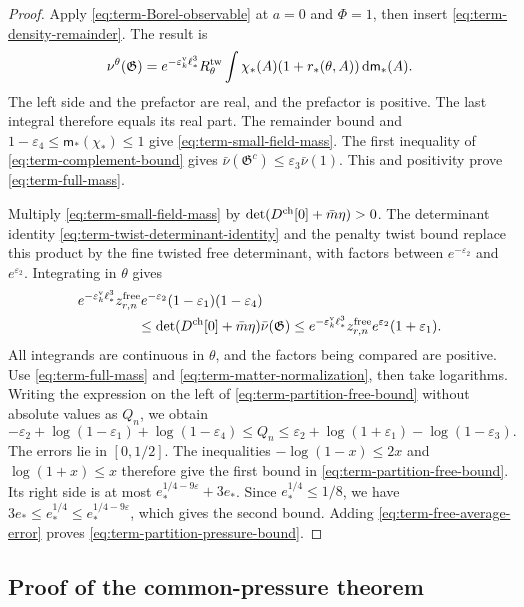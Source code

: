 \begin{proof}
Apply \eqref{eq:term-Borel-observable} at $a=0$ and
$\Phi=1$, then insert \eqref{eq:term-density-remainder}.
The result is
\[
 \nu^\theta(\mathfrak G)=
 e^{-\varepsilon_k^{\rm v}\ell_*^3}R_\theta^{\rm tw}
       \int\chi_*(A)(1+r_*(\theta,A))\,\mathrm d\mathsf m_*(A).
\]
The left side and the prefactor are real, and the
prefactor is positive. The last integral therefore
equals its real part.
The remainder bound and
$1-\varepsilon_4\le\mathsf m_*(\chi_*)\le1$
give \eqref{eq:term-small-field-mass}.
The first inequality of \eqref{eq:term-complement-bound}
gives
$\bar\nu(\mathfrak G^c)\le\varepsilon_3\bar\nu(1)$.
This and positivity prove \eqref{eq:term-full-mass}.

Multiply \eqref{eq:term-small-field-mass} by
$\det(D^{\rm ch}[0]+\bar m\eta)>0$.
The determinant identity
\eqref{eq:term-twist-determinant-identity} and the
penalty twist bound replace this product by the fine
twisted free determinant, with factors between
$e^{-\varepsilon_2}$ and $e^{\varepsilon_2}$.
Integrating in $\theta$ gives
\begin{align*}
 &e^{-\varepsilon_k^{\rm v}\ell_*^3}z_{r,n}^{\rm free}
       e^{-\varepsilon_2}(1-\varepsilon_1)(1-\varepsilon_4)
 \\
 &\hspace{15mm}\le
     \det(D^{\rm ch}[0]+\bar m\eta)\bar\nu(\mathfrak G)
 \le e^{-\varepsilon_k^{\rm v}\ell_*^3}z_{r,n}^{\rm free}
                              e^{\varepsilon_2}(1+\varepsilon_1).
\end{align*}
All integrands are continuous in $\theta$, and the
factors being compared are positive.
Use \eqref{eq:term-full-mass} and
\eqref{eq:term-matter-normalization}, then take logarithms.
Writing the expression on the left of
\eqref{eq:term-partition-free-bound} without absolute
values as $Q_n$, we obtain
\[
 -\varepsilon_2+\log(1-\varepsilon_1)+\log(1-\varepsilon_4)
 \le Q_n\le
 \varepsilon_2+\log(1+\varepsilon_1)-\log(1-\varepsilon_3).
\]
The errors lie in $[0,1/2]$. The inequalities
$-\log(1-x)\le2x$ and $\log(1+x)\le x$ therefore give
the first bound in \eqref{eq:term-partition-free-bound}.
Its right side is at most
$e_*^{1/4-9\varepsilon}+3e_*$.
Since $e_*^{1/4}\le1/8$, we have
$3e_*\le e_*^{1/4}\le e_*^{1/4-9\varepsilon}$,
which gives the second bound.
Adding \eqref{eq:term-free-average-error} proves
\eqref{eq:term-partition-pressure-bound}.
\end{proof}

\subsection{Proof of the common-pressure theorem}
\label{subsec:tpm-common-proof}



